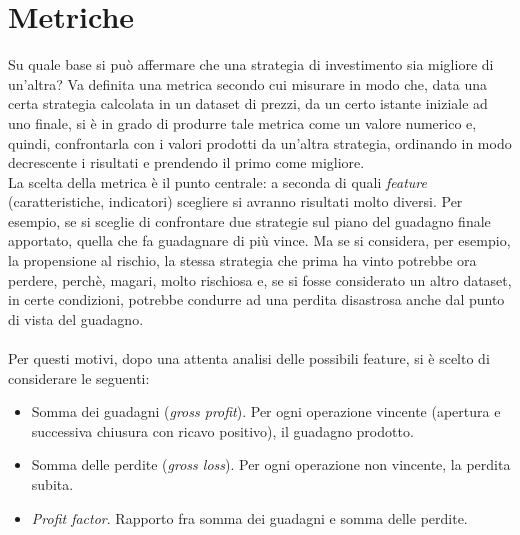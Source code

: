 \documentclass[a4paper,12pt]{report}
\begin{document}
\section{Metriche}
Su quale base si può affermare che una strategia di investimento sia migliore di un'altra? Va definita una metrica secondo cui misurare in modo che, data una certa strategia calcolata in un dataset di prezzi, da un certo istante iniziale ad uno finale, si è in grado di produrre tale metrica come un valore numerico e, quindi, confrontarla con i valori prodotti da un'altra strategia, ordinando in modo decrescente i risultati e prendendo il primo come migliore.\\ La scelta della metrica è il punto centrale: a seconda di quali \textit{feature} (caratteristiche, indicatori) scegliere si avranno risultati molto diversi. Per esempio, se si sceglie di confrontare due strategie sul piano del guadagno finale apportato, quella che fa guadagnare di più vince. Ma se si considera, per esempio, la propensione al rischio, la stessa strategia che prima ha vinto potrebbe ora perdere, perchè, magari, molto rischiosa e, se si fosse considerato un altro dataset, in certe condizioni, potrebbe condurre ad una perdita disastrosa anche dal punto di vista del guadagno.\\~\\ Per questi motivi, dopo una attenta analisi delle possibili feature, si è scelto di considerare le seguenti:
\begin{itemize}
	\item Somma dei guadagni (\textit{gross profit}). Per ogni operazione vincente (apertura e successiva chiusura con ricavo positivo), il guadagno prodotto.
	\item Somma delle perdite (\textit{gross loss}). Per ogni operazione non vincente, la perdita subita.
	\item \textit{Profit factor}. Rapporto fra somma dei guadagni e somma delle perdite.
\end{itemize}
\end{document}
